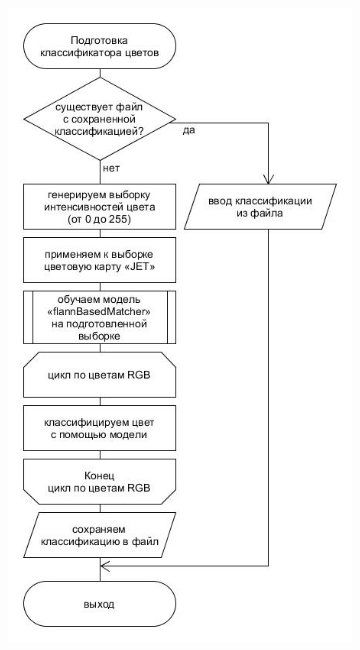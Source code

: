 \documentclass[14pt, a4paper]{extreport}
\begin{document}
	\begin{figure}[h!]
		\begin{subfigure}{.59\textwidth}
			\centering
			\includegraphics[width = \textwidth]{image/chapter_2/colorclassification}
			\caption{}
		\end{subfigure}
		\begin{subfigure}{.31\textwidth}
			\centering

\end{subfigure}
\end{figure}
\end{document}
